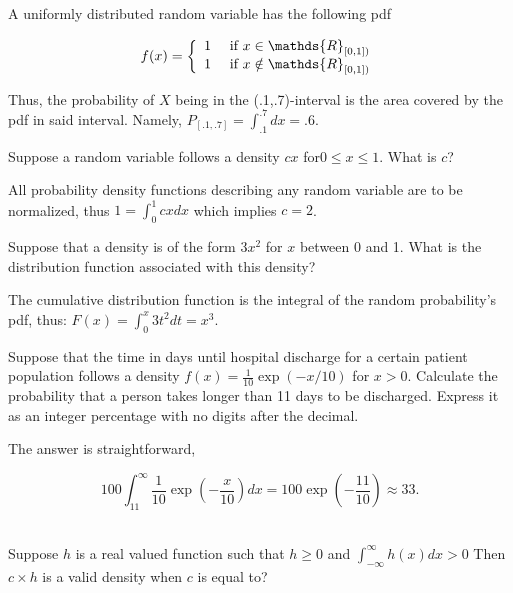 \documentclass{homework}
\begin{document}
A uniformly distributed random variable has the following pdf

$$
f(x)= \left\{ \begin{array}{lcc}
             1 &  \textnormal{ if } x \in \mathds{R}_{[0,1])}  \\
             1 &  \textnormal{ if } x \notin \mathds{R}_{[0,1])}
             \end{array}
   \right.
$$

Thus, the probability of $X$ being in the (.1,.7)-interval is the area covered by the pdf in said interval. Namely, $P_{[.1,.7]} = \int_{.1}^{.7} dx = .6$. \\

\begin{tcolorbox}[title=Question 5]
Suppose a random variable follows a density $cx$ for$ 0\leq x \leq 1$. What is $c$?
\end{tcolorbox}

All probability density functions describing any random variable are to be normalized, thus $1=\int_{0}^{1} cxdx$ which implies $c=2$. \\

\begin{tcolorbox}[title=Question 6]
Suppose that a density is of the form $3x^2$ for 
$x$ between 0 and 1. What is the distribution function associated with this density?
\end{tcolorbox}

The cumulative distribution function is the integral of the random probability's pdf, thus: $F(x)=\int_{0}^{x} 3t^2 dt=x^3.$ \\

\begin{tcolorbox}[title=Question 7]
Suppose that the time in days until hospital discharge for a certain patient population follows a density $f(x) = \frac{1}{10}\exp(-x/10)$ for $x > 0$.  Calculate the probability that a person takes longer than 11 days to be discharged. Express it as an integer percentage with no digits after the decimal.
\end{tcolorbox}

The answer is straightforward, 

$$
100 \int_{11}^{\infty}\frac{1}{10}\exp\left(-\frac{x}{10}\right)dx =100\exp \left(-\frac{11}{10}\right)\approx 33.
$$ \\

\begin{tcolorbox}[title=Question 8]
Suppose $h$ is a real valued function such that $h \geq 0$ and $\int_{-\infty}^\infty h(x)dx > 0$ Then $c \times h$ is a valid density when $c$ is equal to?
\end{tcolorbox}
\end{document}
